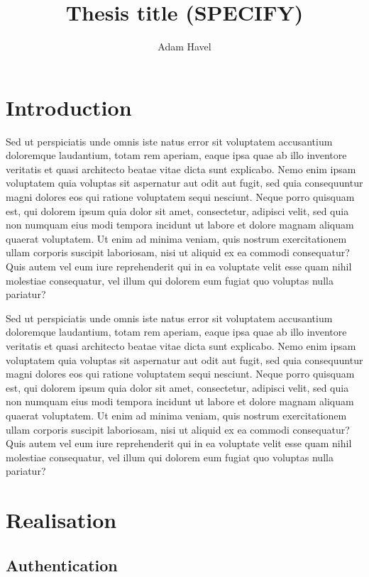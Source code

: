 \documentclass[thesis=M,english,hidelinks]{FITthesis}[2012/10/20]
\title{Thesis title (SPECIFY)}
\author{Adam Havel}
\begin{document}
\chapter{Introduction}

Sed ut perspiciatis unde omnis iste natus error sit voluptatem accusantium doloremque laudantium, totam rem aperiam, eaque ipsa quae ab illo inventore veritatis et quasi architecto beatae vitae dicta sunt explicabo. Nemo enim ipsam voluptatem quia voluptas sit aspernatur aut odit aut fugit, sed quia consequuntur magni dolores eos qui ratione voluptatem sequi nesciunt. Neque porro quisquam est, qui dolorem ipsum quia dolor sit amet, consectetur, adipisci velit, sed quia non numquam eius modi tempora incidunt ut labore et dolore magnam aliquam quaerat voluptatem. Ut enim ad minima veniam, quis nostrum exercitationem ullam corporis suscipit laboriosam, nisi ut aliquid ex ea commodi consequatur? Quis autem vel eum iure \cite{rybicka} reprehenderit qui in ea voluptate velit esse quam nihil molestiae consequatur, vel illum qui dolorem eum fugiat quo voluptas nulla pariatur?

Sed ut perspiciatis unde omnis iste natus error sit voluptatem accusantium doloremque laudantium, totam rem aperiam, eaque ipsa quae ab illo inventore veritatis et quasi architecto beatae vitae dicta sunt explicabo. Nemo enim ipsam voluptatem quia voluptas sit aspernatur aut odit aut fugit, sed quia consequuntur magni dolores eos qui ratione voluptatem sequi nesciunt. Neque porro quisquam est, qui dolorem ipsum quia dolor sit amet, consectetur, adipisci velit, sed quia non numquam eius modi tempora incidunt ut labore et dolore magnam aliquam quaerat voluptatem. Ut enim ad minima veniam, quis nostrum exercitationem ullam corporis suscipit laboriosam, nisi ut aliquid ex ea commodi consequatur? Quis autem vel eum iure \cite{rybicka} reprehenderit qui in ea voluptate velit esse quam nihil molestiae consequatur, vel illum qui dolorem eum fugiat quo voluptas nulla pariatur?


\chapter{Realisation}

\section{Authentication}
\end{document}
